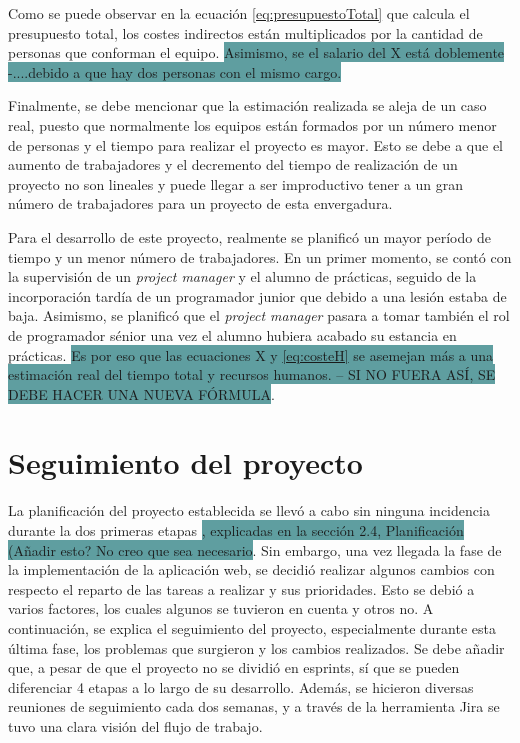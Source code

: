 \documentclass[pdftex,11pt,a4paper]{book}
\begin{document}
Como se puede observar en la ecuación \ref{eq:presupuestoTotal} que calcula el presupuesto total, los costes indirectos están multiplicados por la cantidad de personas que conforman el equipo. \colorbox{CadetBlue}{Asimismo, se el salario del X está doblemente -....debido a que hay dos personas con el mismo cargo. }

Finalmente, se debe mencionar que la estimación realizada se aleja de un caso real, puesto que normalmente los equipos están formados por un número menor de personas y el tiempo para realizar el proyecto es mayor. Esto se debe a que el aumento de trabajadores y el decremento del tiempo de realización de un proyecto no son lineales y puede llegar a ser improductivo tener a un gran número de trabajadores para un proyecto de esta envergadura.

Para el desarrollo de este proyecto, realmente se planificó un mayor período de tiempo y un menor número de trabajadores. En un primer momento, se contó con la supervisión de un \textit{project manager} y el alumno de prácticas, seguido de la incorporación tardía de un programador junior que debido a una lesión estaba de baja. Asimismo, se planificó que el \textit{project manager} pasara a tomar también el rol de programador sénior una vez el alumno hubiera acabado su estancia en prácticas. \colorbox{CadetBlue}{Es por eso que las ecuaciones X y \ref{eq:costeH} se asemejan más a una estimación real del tiempo total y recursos humanos. -- SI NO FUERA ASÍ, SE DEBE HACER UNA NUEVA FÓRMULA}.




\section{Seguimiento del proyecto}

La planificación del proyecto establecida se llevó a cabo sin ninguna incidencia durante la dos primeras etapas \colorbox{CadetBlue}{, explicadas en la sección 2.4, Planificación (Añadir esto? No creo que sea necesario}. Sin embargo, una vez llegada la fase de la implementación de la aplicación web, se decidió realizar algunos cambios con respecto el reparto de las tareas a realizar y sus prioridades. Esto se debió a varios factores, los cuales algunos se tuvieron en cuenta y otros no. A continuación, se explica el seguimiento del proyecto, especialmente durante esta última fase, los problemas que surgieron y los cambios realizados. Se debe añadir que, a pesar de que el proyecto no se dividió en esprints, sí que se pueden diferenciar 4 etapas a lo largo de su desarrollo. Además, se hicieron diversas reuniones de seguimiento cada dos semanas, y a través de la herramienta Jira se tuvo una clara visión del flujo de trabajo.
\end{document}
